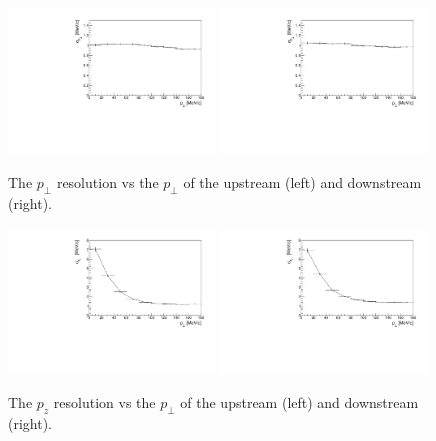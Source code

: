   \begin{figure}[p]
   \begin{center}
     \includegraphics[width=0.49\textwidth, angle=0]{08-Performance/upstream_pt_resolution_pt.pdf}
     \includegraphics[width=0.49\textwidth, angle=0]{08-Performance/downstream_pt_resolution_pt.pdf}
     \caption{\label{fig:PtPtResolKalman} The $p_{\perp}$ resolution vs the $p_{\perp}$ of the upstream (left) and downstream (right).}
   \end{center}
  \end{figure}
  
  \begin{figure}[p]
   \begin{center}
     \includegraphics[width=0.49\textwidth, angle=0]{08-Performance/upstream_pz_resolution_pt.pdf}
     \includegraphics[width=0.49\textwidth, angle=0]{08-Performance/downstream_pz_resolution_pt.pdf}
     \caption{\label{fig:PtPzResolKalman} The $p_z$ resolution vs the $p_{\perp}$ of the upstream (left) and downstream (right).}
   \end{center}
  \end{figure}
